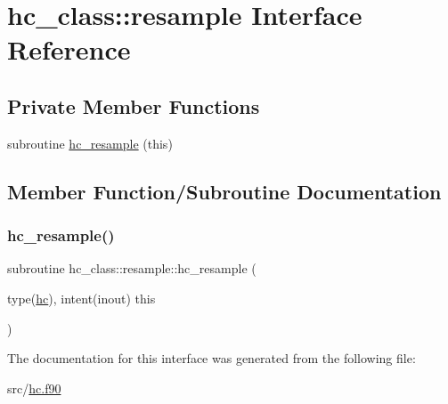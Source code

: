 \hypertarget{interfacehc__class_1_1resample}{}\section{hc\+\_\+class\+:\+:resample Interface Reference}
\label{interfacehc__class_1_1resample}
\subsection*{Private Member Functions}
\begin{DoxyCompactItemize}
\item 
subroutine \hyperlink{interfacehc__class_1_1resample_a649a3a2a36b72301111a3033e07ef367}{hc\+\_\+resample} (this)
\end{DoxyCompactItemize}


\subsection{Member Function/\+Subroutine Documentation}
\mbox{\label{interfacehc__class_1_1resample_a649a3a2a36b72301111a3033e07ef367}} 
\subsubsection{\texorpdfstring{hc\+\_\+resample()}{hc\_resample()}}
{\footnotesize\ttfamily subroutine hc\+\_\+class\+::resample\+::hc\+\_\+resample (\begin{DoxyParamCaption}\item[{type(\hyperlink{structhc__class_1_1hc}{hc}), intent(inout)}]{this }\end{DoxyParamCaption})\hspace{0.3cm}{\ttfamily [private]}}



The documentation for this interface was generated from the following file\+:\begin{DoxyCompactItemize}
\item 
src/\hyperlink{hc_8f90}{hc.\+f90}\end{DoxyCompactItemize}
